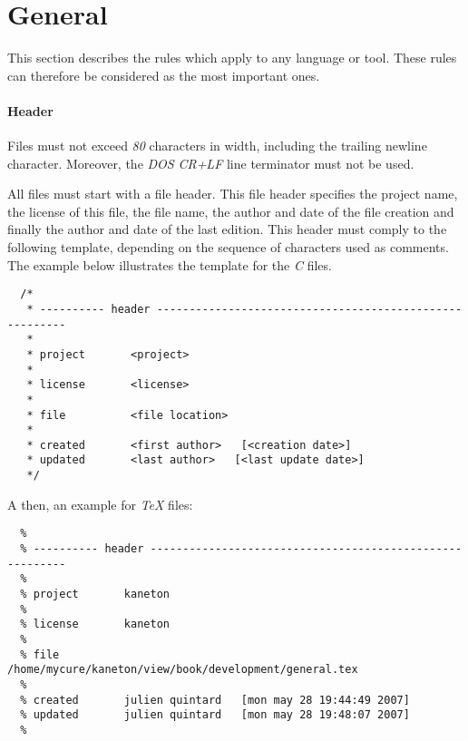 %
%
%
%
%
%

%
%

\chapter{General}

This section describes the rules which apply to any language or tool. These
rules can therefore be considered as the most important ones.


\subsubsection{Header}

Files must not exceed \textit{80} characters in width, including
the trailing newline character. Moreover, the \textit{DOS} \textit{CR+LF}
line terminator must not be used.

All files must start with a file header. This file header specifies the
project name, the license of this file, the file name, the author and
date of the file creation and finally the author and date of the last
edition. This header must comply to the following template, depending
on the sequence of characters used as comments. The example below illustrates
the template for the \textit{C} files.

\begin{verbatim}
  /*
   * ---------- header --------------------------------------------------------
   *
   * project       <project>
   *
   * license       <license>
   *
   * file          <file location>
   *
   * created       <first author>   [<creation date>]
   * updated       <last author>   [<last update date>]
   */
\end{verbatim}

A then, an example for \textit{TeX} files:

\begin{verbatim}
  %
  % ---------- header ---------------------------------------------------------
  %
  % project       kaneton
  %
  % license       kaneton
  %
  % file          /home/mycure/kaneton/view/book/development/general.tex
  %
  % created       julien quintard   [mon may 28 19:44:49 2007]
  % updated       julien quintard   [mon may 28 19:48:07 2007]
  %
\end{verbatim}

